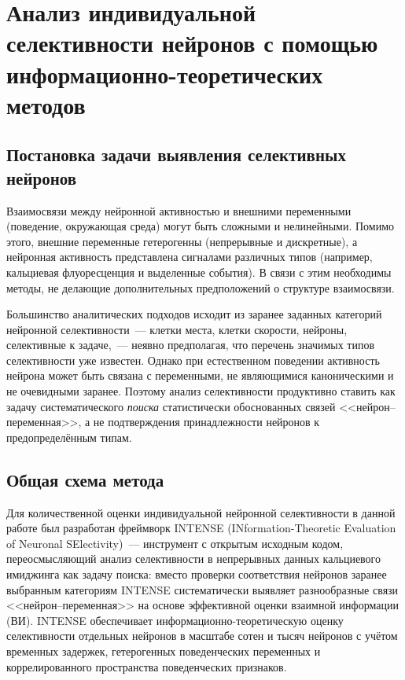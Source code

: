 %
%
%

\section{Анализ индивидуальной селективности нейронов с помощью информационно-теоретических методов}\label{sec:intense}

\subsection{Постановка задачи выявления селективных нейронов}

Взаимосвязи между нейронной активностью и внешними переменными (поведение, окружающая среда) могут быть сложными и нелинейными. Помимо этого, внешние переменные гетерогенны (непрерывные и дискретные), а нейронная активность представлена сигналами различных типов (например, кальциевая флуоресценция и выделенные события). В связи с этим необходимы методы, не делающие дополнительных предположений о структуре взаимосвязи.

Большинство аналитических подходов исходит из заранее заданных категорий нейронной селективности~--- клетки места, клетки скорости, нейроны, селективные к задаче,~--- неявно предполагая, что перечень значимых типов селективности уже известен. Однако при естественном поведении активность нейрона может быть связана с переменными, не являющимися каноническими и не очевидными заранее. Поэтому анализ селективности продуктивно ставить как задачу систематического \textit{поиска} статистически обоснованных связей <<нейрон--переменная>>, а не подтверждения принадлежности нейронов к предопределённым типам.

\subsection{Общая схема метода}

Для количественной оценки индивидуальной нейронной селективности в данной работе был разработан фреймворк INTENSE (INformation-Theoretic Evaluation of Neuronal SElectivity)~--- инструмент с открытым исходным кодом, переосмысляющий анализ селективности в непрерывных данных кальциевого имиджинга как задачу поиска: вместо проверки соответствия нейронов заранее выбранным категориям INTENSE систематически выявляет разнообразные связи <<нейрон--переменная>> на основе эффективной оценки взаимной информации (ВИ). INTENSE обеспечивает информационно-теоретическую оценку селективности отдельных нейронов в масштабе сотен и тысяч нейронов с учётом временных задержек, гетерогенных поведенческих переменных и коррелированного пространства поведенческих признаков.

